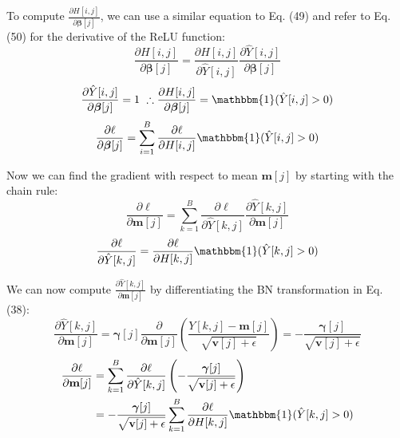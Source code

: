\documentclass{article}
\begin{document}
{To compute $\frac{\partial H[i,j]}{\partial \boldsymbol{\beta}[j]}$, we can use a similar equation to Eq. (49) and refer to Eq. (50) for the derivative of the ReLU function:
\begin{equation}
    \frac{\partial H[i,j]}{\partial \boldsymbol{\beta}[j]}= \frac{\partial H[i,j]}{\partial \hat{Y}[i,j]} \frac{\partial \hat{Y}[i,j]}{\partial \boldsymbol{\beta}[j]}
\end{equation}
\begin{equation}
    \frac{\partial \hat{Y}[i,j]}{\partial \boldsymbol{\beta}[j]}= 1 \ \therefore \frac{\partial H[i,j]}{\partial \boldsymbol{\beta}[j]}= \mathbbm{1}(\hat{Y}[i,j]>0)
\end{equation}
\begin{equation}
    \frac{\partial \ell}{\partial \boldsymbol{\beta}[j]}= \sum_{i=1}^{B} \frac{\partial \ell}{\partial H[i,j]} \mathbbm{1}(\hat{Y}[i,j]>0)
\end{equation}

Now we can find the gradient with respect to mean $\textbf{m}[j]$ by starting with the chain rule:
\begin{equation}
    \frac{\partial \ell}{\partial \textbf{m}[j]}= \sum_{k=1}^{B} \frac{\partial \ell}{\partial \hat{Y}[k,j]} \frac{\partial \hat{Y}[k,j]}{\partial \textbf{m}[j]}
\end{equation}
\begin{equation}
    \frac{\partial \ell}{\partial \hat{Y}[k,j]}= \frac{\partial \ell}{\partial H[k,j]} \mathbbm{1}(\hat{Y}[k,j]>0)
\end{equation}

We can now compute $\frac{\partial \hat{Y}[k,j]}{\partial \textbf{m}[j]}$ by differentiating the BN transformation in Eq. (38):
\begin{equation}
    \frac{\partial \hat{Y}[k,j]}{\partial \textbf{m}[j]}= \boldsymbol{\gamma}[j] \frac{\partial}{\partial \textbf{m}[j]} \left(\frac{Y[k,j]- \textbf{m}[j]}{\sqrt{\textbf{v}[j]+ \epsilon}}\right)= -\frac{\boldsymbol{\gamma}[j]}{\sqrt{\textbf{v}[j]+ \epsilon}}
\end{equation}
\begin{equation}
\begin{aligned}
    \frac{\partial \ell}{\partial \textbf{m}[j]}&= \sum_{k=1}^{B} \frac{\partial \ell}{\partial \hat{Y}[k,j]} \left(-\frac{\boldsymbol{\gamma}[j]}{\sqrt{\textbf{v}[j]+ \epsilon}} \right)\\
    &= -\frac{\boldsymbol{\gamma}[j]}{\sqrt{\textbf{v}[j]+ \epsilon}} \sum_{k=1}^{B} \frac{\partial \ell}{\partial H[k,j]} \mathbbm{1}(\hat{Y}[k,j]>0)
\end{aligned}
\end{equation}

}
\end{document}
